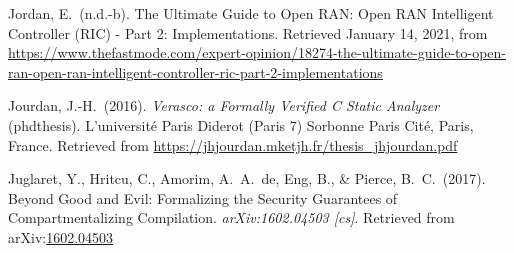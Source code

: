 \documentclass[12pt,twoside]{article}
\begin{document}
{\begin{thebibliography}{1079}
\mdbibitemlabel{}Jordan, E.~(n.d.-b). The Ultimate Guide to Open RAN: Open RAN Intelligent Controller (RIC) - Part 2: Implementations. Retrieved January 14, 2021, from \href{https://www.thefastmode.com/expert-opinion/18274-the-ultimate-guide-to-open-ran-open-ran-intelligent-controller-ric-part-2-implementations}{{\ttfamily https://\hspace{0pt}www.\hspace{0pt}thefastmode.\hspace{0pt}com/\hspace{0pt}expert-\hspace{0pt}opinion/\hspace{0pt}18274-\hspace{0pt}the-\hspace{0pt}ultimate-\hspace{0pt}guide-\hspace{0pt}to-\hspace{0pt}open-\hspace{0pt}ran-\hspace{0pt}open-\hspace{0pt}ran-\hspace{0pt}intelligent-\hspace{0pt}controller-\hspace{0pt}ric-\hspace{0pt}part-\hspace{0pt}2-\hspace{0pt}implementations}}%

\mdbibitemlabel{}Jourdan, J.-H.~(2016). \emph{Verasco: a Formally Verified C Static Analyzer} (phdthesis). L’université Paris Diderot (Paris 7) Sorbonne Paris Cité, Paris, France. Retrieved from \href{https://jhjourdan.mketjh.fr/thesis_jhjourdan.pdf}{{\ttfamily https://\hspace{0pt}jhjourdan.\hspace{0pt}mketjh.\hspace{0pt}fr/\hspace{0pt}thesis\_\hspace{0pt}jhjourdan.\hspace{0pt}pdf}}%

\mdbibitemlabel{}Juglaret, Y., Hritcu, C., Amorim, A.~A.~de, Eng, B., \& Pierce, B.~C.~(2017). Beyond Good and Evil: Formalizing the Security Guarantees of Compartmentalizing Compilation. \emph{arXiv:1602.04503 {}[cs]}. Retrieved from arXiv:\href{http://arxiv.org/abs/1602.04503}{1602.04503}%


\end{thebibliography}}
\end{document}
